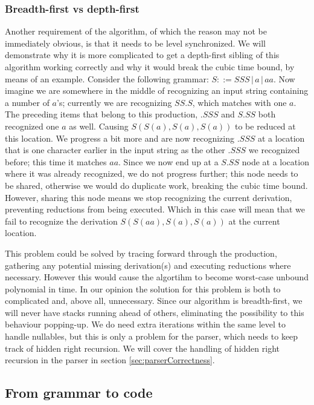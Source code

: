 \documentclass[a4paper,10pt]{article}
\begin{document}
\subsubsection{Breadth-first vs depth-first}
Another requirement of the algorithm, of which the reason may not be immediately obvious, is that it needs to be level synchronized. We will demonstrate why it is more complicated to get a depth-first sibling of this algorithm working correctly and why it would break the cubic time bound, by means of an example. Consider the following grammar: $S ::= SSS\,|\,a\,|\,aa$. Now imagine we are somewhere in the middle of recognizing an input string containing a number of $a$'s; currently we are recognizing $SS.S$, which matches with one $a$. The preceding items that belong to this production, $.SSS$ and $S.SS$ both recognized one $a$ as well. Causing $S(S(a),S(a),S(a))$ to be reduced at this location. We progress a bit more and are now recognizing $.SSS$ at a location that is one character earlier in the input string as the other $.SSS$ we recognized before; this time it matches $aa$. Since we now end up at a $S.SS$ node at a location where it was already recognized, we do not progress further; this node needs to be shared, otherwise we would do duplicate work, breaking the cubic time bound. However, sharing this node means we stop recognizing the current derivation, preventing reductions from being executed. Which in this case will mean that we fail to recognize the derivation $S(S(aa),S(a),S(a))$ at the current location.

This problem could be solved by tracing forward through the production, gathering any potential missing derivation(s) and executing reductions where necessary. However this would cause the algortihm to become worst-case unbound polynomial in time. In our opinion the solution for this problem is both to complicated and, above all, unnecessary. Since our algorithm is breadth-first, we will never have stacks running ahead of others, eliminating the possibility to this behaviour popping-up. We do need extra iterations within the same level to handle nullables, but this is only a problem for the parser, which needs to keep track of hidden right recursion. We will cover the handling of hidden right recursion in the parser in section \ref{sec:parserCorrectness}.

\subsection{From grammar to code}
\end{document}
